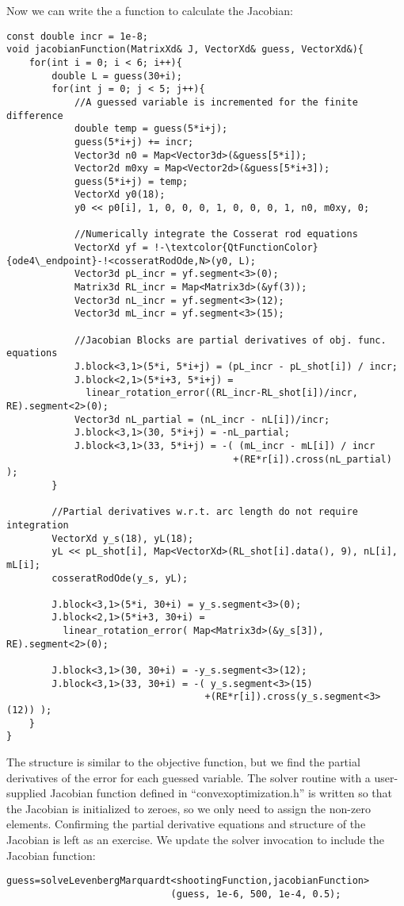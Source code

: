 \documentclass[12pt]{article}
\begin{document}
\clearpage \noindent
Now we can write the a function to calculate the Jacobian:
\begin{lstlisting}
const double incr = 1e-8;
void jacobianFunction(MatrixXd& J, VectorXd& guess, VectorXd&){
    for(int i = 0; i < 6; i++){
        double L = guess(30+i);
        for(int j = 0; j < 5; j++){
            //A guessed variable is incremented for the finite difference
            double temp = guess(5*i+j);
            guess(5*i+j) += incr;
            Vector3d n0 = Map<Vector3d>(&guess[5*i]);
            Vector2d m0xy = Map<Vector2d>(&guess[5*i+3]);
            guess(5*i+j) = temp;
            VectorXd y0(18);
            y0 << p0[i], 1, 0, 0, 0, 1, 0, 0, 0, 1, n0, m0xy, 0;

            //Numerically integrate the Cosserat rod equations
            VectorXd yf = !-\textcolor{QtFunctionColor}{ode4\_endpoint}-!<cosseratRodOde,N>(y0, L);
            Vector3d pL_incr = yf.segment<3>(0);
            Matrix3d RL_incr = Map<Matrix3d>(&yf(3));
            Vector3d nL_incr = yf.segment<3>(12);
            Vector3d mL_incr = yf.segment<3>(15);

            //Jacobian Blocks are partial derivatives of obj. func. equations
            J.block<3,1>(5*i, 5*i+j) = (pL_incr - pL_shot[i]) / incr;
            J.block<2,1>(5*i+3, 5*i+j) =
              linear_rotation_error((RL_incr-RL_shot[i])/incr, RE).segment<2>(0);
            Vector3d nL_partial = (nL_incr - nL[i])/incr;
            J.block<3,1>(30, 5*i+j) = -nL_partial;
            J.block<3,1>(33, 5*i+j) = -( (mL_incr - mL[i]) / incr
                                        +(RE*r[i]).cross(nL_partial) );
        }

        //Partial derivatives w.r.t. arc length do not require integration
        VectorXd y_s(18), yL(18);
        yL << pL_shot[i], Map<VectorXd>(RL_shot[i].data(), 9), nL[i], mL[i];
        cosseratRodOde(y_s, yL);

        J.block<3,1>(5*i, 30+i) = y_s.segment<3>(0);
        J.block<2,1>(5*i+3, 30+i) =
          linear_rotation_error( Map<Matrix3d>(&y_s[3]), RE).segment<2>(0);

        J.block<3,1>(30, 30+i) = -y_s.segment<3>(12);
        J.block<3,1>(33, 30+i) = -( y_s.segment<3>(15)
                                   +(RE*r[i]).cross(y_s.segment<3>(12)) );
    }
}
\end{lstlisting}
The structure is similar to the objective function, but we find the partial derivatives of the error for each guessed variable. The solver routine with a user-supplied Jacobian function defined in ``convexoptimization.h'' is written so that the Jacobian is initialized to zeroes, so we only need to assign the non-zero elements. Confirming the partial derivative equations and structure of the Jacobian is left as an exercise. We update the solver invocation to include the Jacobian function:
\begin{lstlisting}
guess=solveLevenbergMarquardt<shootingFunction,jacobianFunction>
                             (guess, 1e-6, 500, 1e-4, 0.5);
\end{lstlisting}
\end{document}
